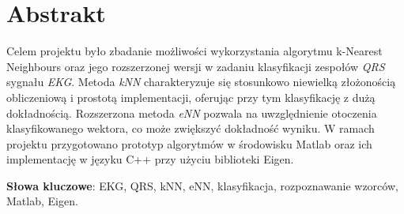 \section*{Abstrakt}

Celem projektu było zbadanie możliwości wykorzystania algorytmu k-Nearest Neighbours oraz jego rozszerzonej wersji w zadaniu klasyfikacji zespołów \textit{QRS} sygnału \textit{EKG}. Metoda \textit{kNN} charakteryzuje się stosunkowo niewielką złożonością obliczeniową i prostotą implementacji, oferując przy tym klasyfikację z dużą dokładnością. Rozszerzona metoda \textit{eNN} pozwala na uwzględnienie otoczenia klasyfikowanego wektora, co może zwiększyć dokładność wyniku. W ramach projektu przygotowano prototyp algorytmów w środowisku Matlab oraz ich implementację w języku C++ przy użyciu biblioteki Eigen.

\textbf{Słowa kluczowe}:
\newline
EKG, QRS, kNN, eNN, klasyfikacja, rozpoznawanie wzorców, Matlab, Eigen.